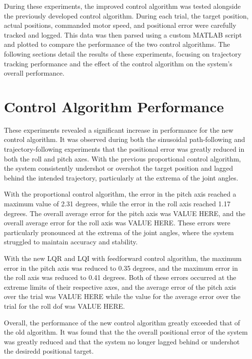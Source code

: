 During these experiments, the improved control algorithm was tested alongside the previously developed control algorithm. During each trial, the target position, actual positions, commanded motor speed, and positional error were carefully tracked and logged. This data was then parsed using a custom MATLAB script and plotted to compare the performance of the two control algorithms. The following sections detail the results of these experiments, focusing on trajectory tracking performance and the effect of the control algorithm on the system's overall performance.

\section{Control Algorithm Performance}
\label{section:trajectory_performance}

These experiments revealed a significant increase in performance for the new control algorithm. It was observed during both the sinusoidal path-following and trajectory-following experiments that the positional error was greatly reduced in both the roll and pitch axes. With the previous proportional control algorithm, the system consistently undershot or overshot the target position and lagged behind the intended trajectory, particularly at the extrema of the joint angles.

With the proportional control algorithm, the error in the pitch axis reached a maximum value of 2.31 degrees, while the error in the roll axis reached 1.17 degrees. The overall average error for the pitch axis was VALUE HERE, and the overall average error for the roll axis was VALUE HERE. These errors were particularly pronounced at the extrema of the joint angles, where the system struggled to maintain accuracy and stability.

With the new LQR and LQI with feedforward control algorithm, the maximum error in the pitch axis was reduced to 0.35 degrees, and the maximum error in the roll axis was reduced to 0.41 degrees. Both of these errors occurred at the extreme limits of their respective axes, and the average error of the pitch axis over the trial was VALUE HERE while the value for the average error over the trial for the roll dof was VALUE HERE.

Overall, the performance of the new control algorithm greatly exceeded that of the old algorithm. It was found that the the overall positional error of the system was greatly  reduced and that the system no longer lagged behind or undershot the desiredd positional target. 